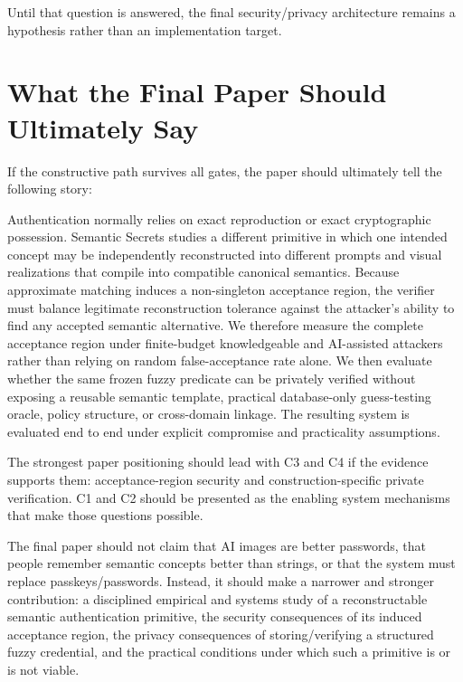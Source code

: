 \documentclass[11pt,a4paper]{article}
\begin{document}
Until that question is answered, the final security/privacy architecture remains a hypothesis rather than an implementation target.

\section{What the Final Paper Should Ultimately Say}

If the constructive path survives all gates, the paper should ultimately tell the following story:

\begin{keybox}
Authentication normally relies on exact reproduction or exact cryptographic possession. Semantic Secrets studies a different primitive in which one intended concept may be independently reconstructed into different prompts and visual realizations that compile into compatible canonical semantics. Because approximate matching induces a non-singleton acceptance region, the verifier must balance legitimate reconstruction tolerance against the attacker's ability to find any accepted semantic alternative. We therefore measure the complete acceptance region under finite-budget knowledgeable and AI-assisted attackers rather than relying on random false-acceptance rate alone. We then evaluate whether the same frozen fuzzy predicate can be privately verified without exposing a reusable semantic template, practical database-only guess-testing oracle, policy structure, or cross-domain linkage. The resulting system is evaluated end to end under explicit compromise and practicality assumptions.
\end{keybox}

The strongest paper positioning should lead with C3 and C4 if the evidence supports them: acceptance-region security and construction-specific private verification. C1 and C2 should be presented as the enabling system mechanisms that make those questions possible.

The final paper should not claim that AI images are better passwords, that people remember semantic concepts better than strings, or that the system must replace passkeys/passwords. Instead, it should make a narrower and stronger contribution: a disciplined empirical and systems study of a reconstructable semantic authentication primitive, the security consequences of its induced acceptance region, the privacy consequences of storing/verifying a structured fuzzy credential, and the practical conditions under which such a primitive is or is not viable.
\end{document}
